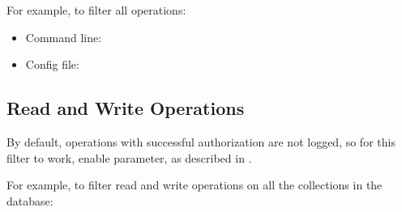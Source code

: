 \documentclass[letterpaper,10pt,english]{sphinxmanual}
\begin{document}
\sphinxAtStartPar
For example, to filter all  operations:
\begin{itemize}
\item {} 
\sphinxAtStartPar
Command line:

\begin{sphinxVerbatim}[commandchars=\\\{\}]
   
\end{sphinxVerbatim}

\item {} 
\sphinxAtStartPar
Config file:

\begin{sphinxVerbatim}[commandchars=\\\{\}]
   
   
\end{sphinxVerbatim}

\end{itemize}


\subsection{Read and Write Operations}
\label{\detokenize{audit-logging:read-and-write-operations}}
\sphinxAtStartPar
By default, operations with successful authorization are not logged,
so for this filter to work, enable  parameter,
as described in {\hyperref[\detokenize{audit-logging:auditauthorizationsuccess}]{}}.

\sphinxAtStartPar
For example, to filter read and write operations
on all the collections in the  database:
\end{document}
